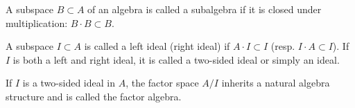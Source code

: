 A subspace $B \subset A$ of an algebra is called a subalgebra if it is closed under multiplication: $B \cdot B \subset B$.

A subspace $I \subset A$ is called a left ideal (right ideal) if $A \cdot I \subset I$ (resp. $I \cdot A \subset I$). If $I$ is both a left and right ideal, it is called a two-sided ideal or simply an ideal.

If $I$ is a two-sided ideal in $A$, the factor space $A/I$ inherits a natural algebra structure and is called the factor algebra.
